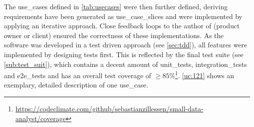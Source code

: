 The \glspl{use_case} defined in \autoref{tab:usecases} were then further defined, deriving requirements have been generated as \glspl{use_case_slice} and were implemented by applying an iterative approach. Close feedback loops to the author of \cite{sassoon2016,sassoon2014,sassoon2016CD} (\gls{product owner} or client) ensured the correctness of these implementations. As the software was developed in a test driven approach (see \autoref{sec:tdd}), all features were implemented by designing tests first. This is reflected by the final test suite (see \autoref{sub:test_suit}), which contains a decent amount of \glspl{unit_test}, \glspl{integration_test} and \glspl{e2e_test} and has an overall test coverage of $ \geq 85\%$\footnote{\url{https://codeclimate.com/github/sebastianzillessen/small-data-analyst/coverage}}. \autoref{uc:121} shows an exemplary, detailed description of one \gls{use_case}.

